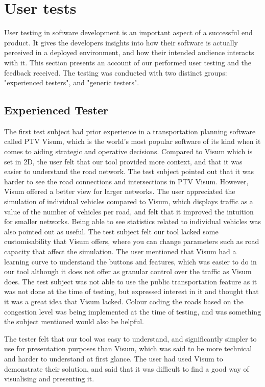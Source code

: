 \section{User tests}
    User testing in software development is an important aspect of a successful end product. It gives the developers insights into how their software is actually perceived in a deployed environment, and how their intended audience interacts with it. This section presents an account of our performed user testing and the feedback received. The testing was conducted with two distinct groups: "experienced testers", and "generic testers". 
    
    \subsection{Experienced Tester}
        The first test subject had prior experience in a transportation planning software called PTV Visum, which is the world's most popular software of its kind when it comes to aiding strategic and operative decisions\cite{visum}. Compared to Visum which is set in 2D, the user felt that our tool provided more context, and that it was easier to understand the road network. The test subject pointed out that it was harder to see the road connections and intersections in PTV Visum. However, Visum offered a better view for larger networks. The user appreciated the simulation of individual vehicles compared to Visum, which displays traffic as a value of the number of vehicles per road, and felt that it improved the intuition for smaller networks. Being able to see statistics related to individual vehicles was also pointed out as useful. The test subject felt our tool lacked some customisability that Visum offers, where you can change parameters such as road capacity that affect the simulation. The user mentioned that Visum had a learning curve to understand the buttons and features, which was easier to do in our tool although it does not offer as granular control over the traffic as Visum does. The test subject was not able to use the public transportation feature as it was not done at the time of testing, but expressed interest in it and thought that it was a great idea that Visum lacked. Colour coding the roads based on the congestion level was being implemented at the time of testing, and was something the subject mentioned would also be helpful.

        The tester felt that our tool was easy to understand, and significantly simpler to use for presentation purposes than Visum, which was said to be more technical and harder to understand at first glance. The user had used Visum to demonstrate their solution, and said that it was difficult to find a good way of visualising and presenting it. 
        
